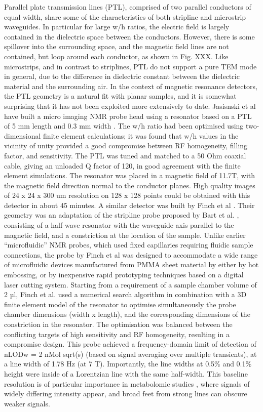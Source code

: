 Parallel plate transmission lines (PTL), comprised of two parallel
conductors of equal width, share some of the characteristics of both
stripline and microstrip waveguides. In particular for large w/h ratios,
the electric field is largely contained in the dielectric space between
the conductors. However, there is some spillover into the surrounding
space, and the magnetic field lines are not contained, but loop around
each conductor, as shown in Fig. XXX. Like microstrips, and in contrast
to striplines, PTL do not support a pure TEM mode in general, due to the
difference in dielectric constant between the dielectric material and
the surrounding air. In the context of magnetic resonance detectors, the
PTL geometry is a natural fit with planar samples, and it is somewhat
surprising that it has not been exploited more extensively to date.
Jasisnski et al have built a micro imaging NMR probe head using a
resonator based on a PTL of 5 mm length and 0.3 mm width
\cite{Jasinski:2012cn}. The w/h ratio had been optimised using
two-dimensional finite element calculations; it was found that w/h
values in the vicinity of unity provided a good compromise between RF
homogeneity, filling factor, and sensitivity. The PTL was tuned and
matched to a 50 Ohm coaxial cable, giving an unloaded Q factor of 120,
in good agreement with the finite element simulations. The resonator was
placed in a magnetic field of 11.7T, with the magnetic field direction
normal to the conductor planes. High quality images of 24 x 24 x 300 um
resolution on 128 x 128 points could be obtained with this detector in
about 45 minutes. A similar detector was built by Finch et al
\cite{Finch:2016gv}. Their geometry was an adaptation of the stripline
probe proposed by Bart et al. \cite{Bart:2009kc}, consisting of a half-wave
resonator with the waveguide axis parallel to the magnetic field, and a
constriction at the location of the sample. Unlike earlier
``microfluidic'' NMR probes, which used fixed capillaries requiring
fluidic sample connections, the probe by Finch et al was designed to
accommodate a wide range of microfluidic devices manufactured from PMMA
sheet material by either by hot embossing, or by inexpensive rapid
prototyping techniques based on a digital laser cutting system. Starting
from a requirement of a sample chamber volume of 2 µl, Finch et al. used
a numerical search algorithm in combination with a 3D finite element
model of the resonator to optimise simultaneously the probe chamber
dimensions (width x length), and the corresponding dimensions of the
constriction in the resonator. The optimisation was balanced between the
conflicting targets of high sensitivity and RF homogeneity, resulting in
a compromise design. This probe achieved a frequency-domain limit of
detection of nLODw = 2 nMol sqrt(s) (based on signal averaging over
multiple transients), at a line width of 1.78 Hz (at 7 T). Importantly,
the line widths at 0.5\% and 0.1\% height were inside of a Lorentzian
line with the same half-width. This baseline resolution is of particular
importance in metabolomic studies \cite{pan2007cac,Zhang:2010kf}, where
signals of widely differing intensity appear, and broad feet from strong
lines can obscure weaker signals. 

